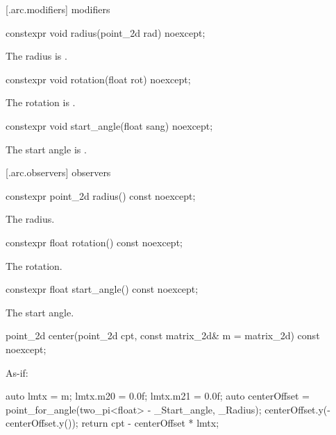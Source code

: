  [\iotwod.arc.modifiers]{ modifiers}

%
\begin{itemdecl}
constexpr void radius(point_2d rad) noexcept;
\end{itemdecl}
\begin{itemdescr}
\pnum
\effects
The radius is .
\end{itemdescr}

%
\begin{itemdecl}
constexpr void rotation(float rot) noexcept;
\end{itemdecl}
\begin{itemdescr}
\pnum
\effects
The rotation is .
\end{itemdescr}

%
\begin{itemdecl}
constexpr void start_angle(float sang) noexcept;
\end{itemdecl}
\begin{itemdescr}
\pnum
\effects
The start angle is .
\end{itemdescr}

 [\iotwod.arc.observers]{ observers}

%
\begin{itemdecl}
constexpr point_2d radius() const noexcept;
\end{itemdecl}
\begin{itemdescr}
\pnum
\returns
The radius.
\end{itemdescr}

%
\begin{itemdecl}
constexpr float rotation() const noexcept;
\end{itemdecl}
\begin{itemdescr}
\pnum
\returns
The rotation.
\end{itemdescr}

%
\begin{itemdecl}
constexpr float start_angle() const noexcept;
\end{itemdecl}
\begin{itemdescr}
\pnum
\returns
The start angle.
\end{itemdescr}

%
\begin{itemdecl}
point_2d center(point_2d cpt, const matrix_2d& m = matrix_2d{})
  const noexcept;
\end{itemdecl}
\begin{itemdescr}
\pnum
\returns
As-if:
\begin{codeblock}
auto lmtx = m;
lmtx.m20 = 0.0f;
lmtx.m21 = 0.0f;
auto centerOffset = point_for_angle(two_pi<float> - _Start_angle, _Radius);
centerOffset.y(-centerOffset.y());
return cpt - centerOffset * lmtx;
\end{codeblock}
\end{itemdescr}

